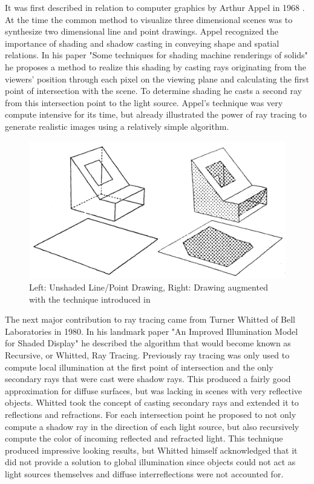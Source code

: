 \documentclass{ACGSeminar}
\begin{document}
It was first described in relation to computer graphics by Arthur Appel in 1968  \cite{Appel68}. At the time the common method to visualize three dimensional scenes was to synthesize two dimensional line and point drawings. Appel recognized the importance of shading and shadow casting in conveying shape and spatial relations. In his paper "Some techniques for shading machine renderings of solids" he proposes a method to realize this shading by casting rays originating from the viewers' position through each pixel on the viewing plane and calculating the first point of intersection with the scene. To determine shading he casts a second ray from this intersection point to the light source. Appel's technique was very compute intensive for its time, but already illustrated the power of ray tracing to generate realistic images using a relatively simple algorithm.

\begin{figure}[htb!]
  \begin{centering}
    \includegraphics[width=12cm,natwidth=1233,natheight=661]{figures/Appel_Shading.png}\par
  \end{centering}
  \caption{Left: Unshaded Line/Point Drawing, Right: Drawing augmented with the technique introduced in \cite{Appel68}}
  \label{fig:appel_tracing}
\end{figure}

The next major contribution to ray tracing came from Turner Whitted of Bell Laboratories in 1980. In his landmark paper "An Improved Illumination Model for Shaded Display" \cite{Whitted:1980} he described the algorithm that would become known as Recursive, or Whitted, Ray Tracing. Previously ray tracing was only used to compute local illumination at the first point of intersection and the only secondary rays that were cast were shadow rays. This produced a fairly good approximation for diffuse surfaces, but was lacking in scenes with very reflective objects. Whitted took the concept of casting secondary rays and extended it to reflections and refractions. For each intersection point he proposed to not only compute a shadow ray in the direction of each light source, but also recursively compute the color of incoming reflected and refracted light. This technique produced impressive looking results, but Whitted himself acknowledged that it did not provide a solution to global illumination since objects could not act as light sources themselves and diffuse interreflections were not accounted for.
\end{document}
